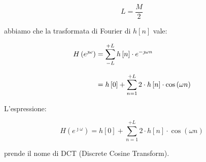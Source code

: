 {
    \Large 
    \begin{equation}
        L = \dfrac{M}{2}
    \end{equation}
}

abbiamo che la trasformata di Fourier di $h \left[ n\right]$ vale: 

{
    \Large 
    \begin{equation}
        \setlength{\jot}{10pt} %
        \begin{split}
            H  \left(e^{\jmath \omega}\right) 
            &= 
            \sum_{- L}^{+ L} 
            h \left[ n\right]
            \cdot 
            e^{- \jmath \omega n} 
            \\
            &= 
            h \left[ 0\right] 
            + 
            \sum_{n = 1}^{+L} 
            2 \cdot h \left[ n\right] \cdot \cos \left(\omega n\right)
        \end{split}
    \end{equation}
}

L'espressione: 

{
    \Large 
    \begin{equation}
        H  \left(e^{\jmath \omega}\right) 
        = 
        h \left[ 0\right] 
        + 
        \sum_{n = 1}^{+L} 
        2 \cdot h \left[ n\right] \cdot \cos \left(\omega n\right)
    \end{equation}
} 

prende il nome di DCT (Discrete Cosine Transform). \newline 

\newpage 


